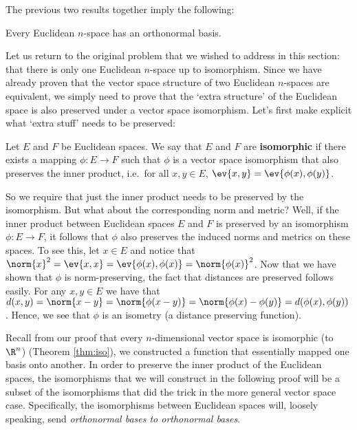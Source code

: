 The previous two results together imply the following:
\begin{theorem}
  Every Euclidean \( n \)-space has an orthonormal basis.
\end{theorem}

Let us return to the original problem that we wished to address in this section: that there is only one Euclidean \( n \)-space up to isomorphism. Since we have already proven that the vector space structure of two Euclidean \( n \)-spaces are equivalent, we simply need to prove that the `extra structure' of the Euclidean space is also preserved under a vector space isomorphism. Let's first make explicit what `extra stuff' needs to be preserved:

\begin{definition}
  Let \( E \) and \( F \) be Euclidean spaces. We say that \( E \) and \( F \) are \textbf{isomorphic} if there exists a mapping \( \phi:E\to F \) such that \( \phi \) is a vector space isomorphism that also preserves the inner product, i.e.\ for all \( x,y\in E \), \( \ev{x,y}=\ev{\phi(x),\phi(y)} \).
\end{definition}

So we require that just the inner product needs to be preserved by the isomorphism. But what about the corresponding norm and metric? Well, if the inner product between Euclidean spaces \( E \) and \( F \) is preserved by an isomorphism \( \phi:E\to F \), it follows that \( \phi \) also preserves the induced norms and metrics on these spaces. To see this, let \( x\in E \) and notice that \( \norm{x}^2=\ev{x,x}=\ev{\phi(x),\phi(x)}=\norm{\phi(x)}^2 \). Now that we have shown that \( \phi \) is norm-preserving, the fact that distances are preserved follows easily. For any \( x,y\in E \) we have that \( d(x,y)=\norm{x-y}=\norm{\phi(x-y)}=\norm{\phi(x)-\phi(y)}=d(\phi(x),\phi(y)) \). Hence, we see that \( \phi \) is an isometry (a distance preserving function).

\vspace{3mm}

Recall from our proof that every \( n \)-dimensional vector space is isomorphic (to \( \R^n \)) (Theorem \ref{thm:iso}), we constructed a function that essentially mapped one basis onto another. In order to preserve the inner product of the Euclidean spaces, the isomorphisms that we will construct in the following proof will be a subset of the isomorphisms that did the trick in the more general vector space case. Specifically, the isomorphisms between Euclidean spaces will, loosely speaking, send \emph{orthonormal bases to orthonormal bases}.


